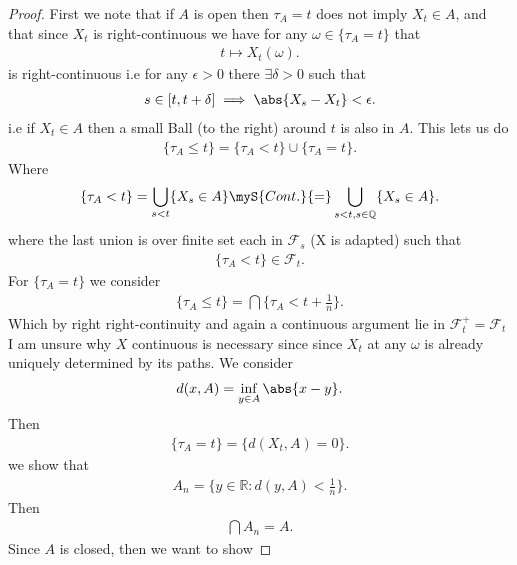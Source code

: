 \begin{proof}
  First we note that if $A$ is open then $\tau_A = t$ does not imply $X_t \in  A$, and that since $X_t$ is right-continuous we have for any 
  $\omega  \in  \{\tau_A =  t\}$ that 
  \begin{align*}
    t \mapsto X_t(\omega )
  .\end{align*}
  is right-continuous i.e for any $\epsilon > 0$ there $\exists \delta  > 0$ such that 
  \begin{align*}
    s \in [t,t+\delta ]  \implies \abs{X_s - X_{t}} < \epsilon
  .\end{align*}
  i.e if $X_t \in  A$ then a small Ball (to the right) around $t$ is also in $A$. This lets us do 
  \begin{align*}
    \{\tau_A \le  t\}   = \{\tau_A < t\}   \cup \{\tau_A = t\}   
  .\end{align*}
  Where
  \begin{align*}
    \{\tau_A < t\}   = \bigcup_{s < t} \{X_s \in A\}   \myS{Cont.}{=} \bigcup_{s < t , s \in \mathbb{Q}} \{X_s \in  A\}   
  .\end{align*}
  where the last union is over finite set each in $\mathcal{F}_s$ (X is adapted) such that 
  \begin{align*}
    \{\tau_A < t\}   \in  \mathcal{F}_t
  .\end{align*}
  For $\{\tau_A = t\}  $ we consider 
  \begin{align*}
    \{\tau_A \le  t\}   = \bigcap \{\tau_A < t+\frac{1}{n}\}   
  .\end{align*}
  Which by right right-continuity and again a continuous argument lie in $\mathcal{F}_t^+ = \mathcal{F}_t$ \\[1ex]
  I am unsure why $X$  continuous is necessary since since $X_t$ at any $\omega$ is already uniquely determined by its paths.
  We consider 
  \begin{align*}
    d(x,A) = \inf_{y \in  A} \abs{x-y}
  .\end{align*}
  Then 
  \begin{align*}
    \{\tau_A = t\}  = \{d(X_t,A) = 0\}  
  .\end{align*}
  we show that 
  \begin{align*}
    A_n = \{y \in  \mathbb{R} : d(y,A) < \frac{1}{n}\}  
  .\end{align*}
  Then 
  \begin{align*}
    \bigcap A_n = A
  .\end{align*}
  Since $A$ is closed, then we want to show 

\end{proof}
